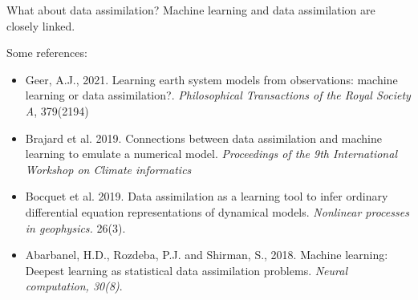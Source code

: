 \documentclass[handout]{beamer}
\begin{document}
\begin{frame}{What about data assimilation?}
    \alert{Machine learning and data assimilation are closely linked.}\\
 { \footnotesize   
     Some references:
 \begin{itemize}
     \item Geer, A.J., 2021. Learning earth system models from observations: machine learning or data assimilation?. {\it Philosophical Transactions of the Royal Society A}, 379(2194)
     \item  Brajard  et al. 2019. Connections between data assimilation and machine learning to emulate a numerical model. {\it Proceedings of the 9th International Workshop on Climate informatics}
     \item Bocquet et al. 2019. Data assimilation as a learning tool to infer ordinary differential equation representations of dynamical models. {\it Nonlinear processes in geophysics.} 26(3).
     \item Abarbanel, H.D., Rozdeba, P.J. and Shirman, S., 2018. Machine learning: Deepest learning as statistical data assimilation problems. {\it Neural computation, 30(8)}.
 \end{itemize}

}

\end{frame}
\end{document}
